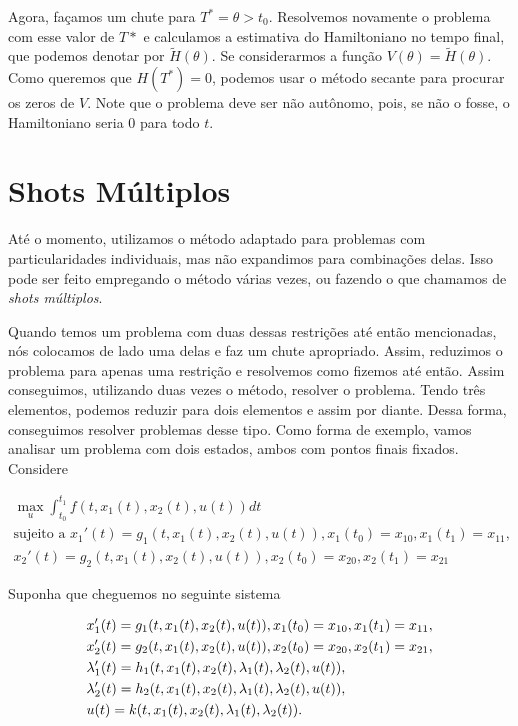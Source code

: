 Agora, façamos um chute para $T^* = \theta > t_0$. Resolvemos novamente o
problema com esse valor de $T*$ e calculamos a estimativa do Hamiltoniano no
tempo final, que podemos denotar por $\tilde{H}(\theta)$. Se considerarmos a
função $V(\theta) = \tilde{H}(\theta)$. Como queremos que $H(T^*) = 0$,
podemos usar o método secante para procurar os zeros de $V$. Note que o
problema deve ser não autônomo, pois, se não o fosse, o Hamiltoniano seria 0
para todo $t$. 

\section{Shots Múltiplos}

Até o momento, utilizamos o método adaptado para problemas com
particularidades individuais, mas não expandimos para combinações delas. Isso
pode ser feito empregando o método várias vezes, ou fazendo o que chamamos de
\textit{shots múltiplos}. 

Quando temos um problema com duas dessas restrições até então
mencionadas, nós colocamos de lado uma delas e faz um chute apropriado. Assim,
reduzimos o problema para apenas uma restrição e resolvemos como fizemos até
então. Assim conseguimos, utilizando duas vezes o método, resolver o problema.
Tendo três elementos, podemos reduzir para dois elementos e assim por diante.
Dessa forma, conseguimos resolver problemas desse tipo. Como forma de exemplo,
vamos analisar um problema com dois estados, ambos com pontos finais fixados.
Considere 

\begin{gather*}
    \max_u \int_{t_0}^{t_1} f(t, x_1(t), x_2(t), u(t)) dt \\
    \text{sujeito a }x_1'(t) = g_1(t, x_1(t), x_2(t), u(t)), x_1(t_0) = x_{10}, x_1(t_1) = x_{11}, \\
    x_2 '(t) = g_2(t, x_1(t), x_2(t), u(t)), x_2(t_0) = x_{20}, x_2(t_1) = x_{21}
\end{gather*}

Suponha que cheguemos no seguinte sistema 

\begin{align*}
    &x_1 '(t) = g_1(t, x_1(t), x_2(t), u(t)), x_1(t_0) = x_{10}, x_1(t_1) = x_{11}, \\
    &x_2 '(t) = g_2(t, x_1(t), x_2(t), u(t)), x_2(t_0) = x_{20}, x_2(t_1) = x_{21}, \\
    &\lambda_1 '(t) = h_1(t, x_1(t), x_2(t), \lambda_1(t), \lambda_2(t), u(t)), \\
    &\lambda_2 '(t) = h_2(t, x_1(t), x_2(t), \lambda_1(t), \lambda_2(t), u(t)), \\
    &u(t) = k(t, x_1(t), x_2(t), \lambda_1(t), \lambda_2(t)).
\end{align*}

